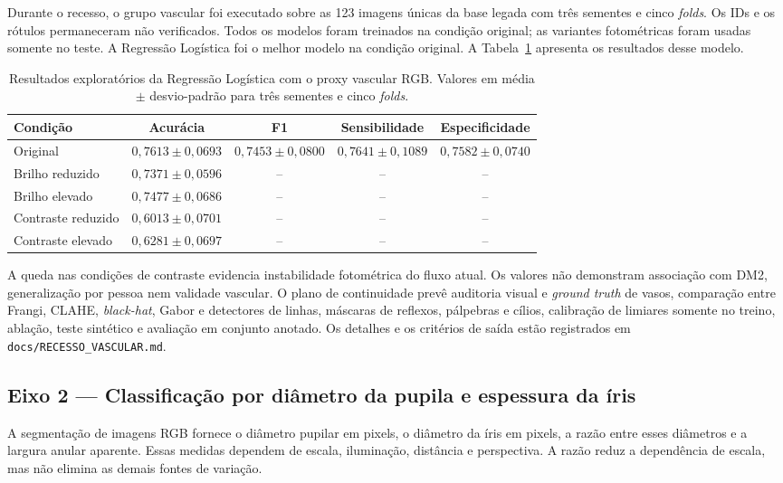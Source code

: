 \documentclass[12pt,a4paper]{article}
\begin{document}
Durante o recesso, o grupo vascular foi executado sobre as 123 imagens únicas da base legada com três
sementes e cinco \textit{folds}. Os IDs e os rótulos permaneceram não verificados. Todos os modelos
foram treinados na condição original; as variantes fotométricas foram usadas somente no teste. A
Regressão Logística foi o melhor modelo na condição original. A Tabela~\ref{tab:recesso-vascular}
apresenta os resultados desse modelo.

\begin{table}[H]
\centering
\caption{Resultados exploratórios da Regressão Logística com o proxy vascular RGB. Valores em média
$\pm$ desvio-padrão para três sementes e cinco \textit{folds}.}
\label{tab:recesso-vascular}
\small
\begin{tabular}{lcccc}
\toprule
\textbf{Condição} & \textbf{Acurácia} & \textbf{F1} & \textbf{Sensibilidade} & \textbf{Especificidade} \\
\midrule
Original          & $0{,}7613 \pm 0{,}0693$ & $0{,}7453 \pm 0{,}0800$ & $0{,}7641 \pm 0{,}1089$ & $0{,}7582 \pm 0{,}0740$ \\
Brilho reduzido   & $0{,}7371 \pm 0{,}0596$ & -- & -- & -- \\
Brilho elevado    & $0{,}7477 \pm 0{,}0686$ & -- & -- & -- \\
Contraste reduzido& $0{,}6013 \pm 0{,}0701$ & -- & -- & -- \\
Contraste elevado & $0{,}6281 \pm 0{,}0697$ & -- & -- & -- \\
\bottomrule
\end{tabular}
\end{table}

A queda nas condições de contraste evidencia instabilidade fotométrica do fluxo atual. Os valores
não demonstram associação com DM2, generalização por pessoa nem validade vascular. O plano de
continuidade prevê auditoria visual e \emph{ground truth} de vasos, comparação entre Frangi, CLAHE,
\emph{black-hat}, Gabor e detectores de linhas, máscaras de reflexos, pálpebras e cílios, calibração de
limiares somente no treino, ablação, teste sintético e avaliação em conjunto anotado. Os detalhes e os
critérios de saída estão registrados em \texttt{docs/RECESSO\_VASCULAR.md}.

\subsection{Eixo 2 --- Classificação por diâmetro da pupila e espessura da íris}
A segmentação de imagens RGB fornece o diâmetro pupilar em pixels, o diâmetro da íris em pixels, a
razão entre esses diâmetros e a largura anular aparente. Essas medidas dependem de escala, iluminação,
distância e perspectiva. A razão reduz a dependência de escala, mas não elimina as demais fontes de
variação.
\end{document}
